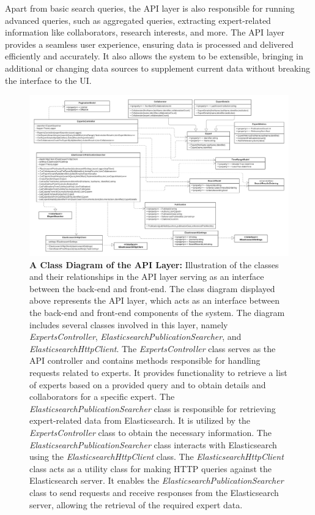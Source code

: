 Apart from basic search queries, the API layer is also responsible for running advanced queries, such as aggregated queries, extracting expert-related information like collaborators, research interests, and more. The API layer provides a seamless user experience, ensuring data is processed and delivered efficiently and accurately. It also allows the system to be extensible, bringing in additional or changing data sources to supplement current data without breaking the interface to the UI. 


\begin{figure}[htp]
    \centering
    \includegraphics[width=\textwidth]{Images/API_ClassDiagram.png}    
    \caption[A Class Diagram of the API Layer]{\textbf{A Class Diagram of the API Layer:} Illustration of the classes and their relationships in the API layer serving as an interface between the back-end and front-end. The class diagram displayed above represents the API layer, which acts as an interface between the back-end and front-end components of the system. The diagram includes several classes involved in this layer, namely \emph{ExpertsController}, \emph{ElasticsearchPublicationSearcher}, and \emph{ElasticsearchHttpClient}. The \emph{ExpertsController} class serves as the API controller and contains methods responsible for handling requests related to experts. It provides functionality to retrieve a list of experts based on a provided query and to obtain details and collaborators for a specific expert. The \emph{ElasticsearchPublicationSearcher} class is responsible for retrieving expert-related data from Elasticsearch. It is utilized by the \emph{ExpertsController} class to obtain the necessary information. The \emph{ElasticsearchPublicationSearcher} class interacts with Elasticsearch using the \emph{ElasticsearchHttpClient} class. The \emph{ElasticsearchHttpClient} class acts as a utility class for making HTTP queries against the Elasticsearch server. It enables the \emph{ElasticsearchPublicationSearcher} class to send requests and receive responses from the Elasticsearch server, allowing the retrieval of the required expert data. }
    \label{fig:api-layer}
\end{figure}

